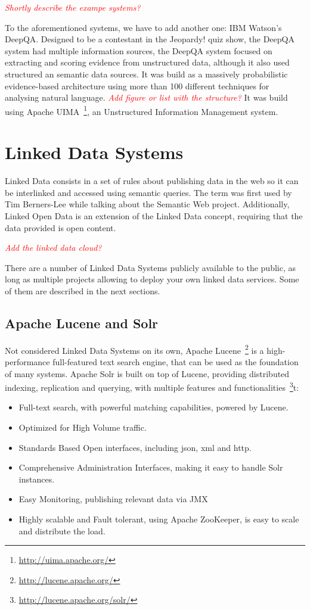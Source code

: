 \emph{\textcolor{red}{Shortly describe the exampe systems?}}

To the aforementioned systems, we have to add another one: IBM Watson's DeepQA. Designed to be a contestant in the Jeopardy! quiz show, the DeepQA system had multiple information sources, the DeepQA system focused on extracting and scoring evidence from unstructured data, although it also used structured an semantic data sources. It was build as a massively probabilistic evidence-based architecture using more than 100 different techniques for analysing natural language. \emph{\textcolor{red}{Add figure or list with the structure?}} It was build using Apache UIMA~\footnote{\url{http://uima.apache.org/}}, an Unstructured Information Management system.

\section{Linked Data Systems}
\label{sec:linkd_sys}

Linked Data consists in a set of rules about publishing data in the web so it can be interlinked and accessed using semantic queries. The term was first used by Tim Berners-Lee while talking about the Semantic Web project. Additionally, Linked Open Data is an extension of the Linked Data concept, requiring that the data provided is open content.

\emph{\textcolor{red}{Add the linked data cloud?}}

There are a number of Linked Data Systems publicly available to the public, as long as multiple projects allowing to deploy your own linked data services. Some of them are described in the next sections. 

\subsection{Apache Lucene and Solr}

Not considered Linked Data Systems on its own, Apache Lucene~\footnote{\url{http://lucene.apache.org/}} is a high-performance full-featured text search engine, that can be used as the foundation of many systems. Apache Solr is built on top of Lucene, providing distributed indexing, replication and querying, with multiple features and functionalities~\footnote{\url{http://lucene.apache.org/solr/}}t:

\begin{itemize}[topsep=0pt,itemsep=-1ex,partopsep=1ex,parsep=1ex]
  \item Full-text search, with powerful matching capabilities, powered by Lucene.
  \item Optimized for High Volume traffic.
  \item Standards Based Open interfaces, including json, xml and http.
  \item Comprehensive Administration Interfaces, making it easy to handle Solr instances.
  \item Easy Monitoring, publishing relevant data via JMX
  \item Highly scalable and Fault tolerant, using Apache ZooKeeper, is easy to scale and distribute the load.
\end{itemize}

